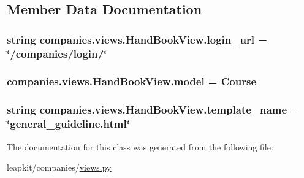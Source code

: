 \subsection{Member Data Documentation}
\hypertarget{classcompanies_1_1views_1_1_hand_book_view_ad0ef5ddf653ad4e570a8c2fed5541a48}{
\subsubsection[{login\-\_\-url}]{\setlength{\rightskip}{0pt plus 5cm}string companies.\-views.\-Hand\-Book\-View.\-login\-\_\-url = \char`\"{}/companies/login/\char`\"{}\hspace{0.3cm}{\ttfamily [static]}}}\label{classcompanies_1_1views_1_1_hand_book_view_ad0ef5ddf653ad4e570a8c2fed5541a48}
\hypertarget{classcompanies_1_1views_1_1_hand_book_view_af9c3733542a035e2832b9e987ee7e26c}{
\subsubsection[{model}]{\setlength{\rightskip}{0pt plus 5cm}companies.\-views.\-Hand\-Book\-View.\-model = {\bf Course}\hspace{0.3cm}{\ttfamily [static]}}}\label{classcompanies_1_1views_1_1_hand_book_view_af9c3733542a035e2832b9e987ee7e26c}
\hypertarget{classcompanies_1_1views_1_1_hand_book_view_a77e51bb1daf5d9fd62a4686a7d482924}{
\subsubsection[{template\-\_\-name}]{\setlength{\rightskip}{0pt plus 5cm}string companies.\-views.\-Hand\-Book\-View.\-template\-\_\-name = \char`\"{}general\-\_\-guideline.\-html\char`\"{}\hspace{0.3cm}{\ttfamily [static]}}}\label{classcompanies_1_1views_1_1_hand_book_view_a77e51bb1daf5d9fd62a4686a7d482924}


The documentation for this class was generated from the following file\-:\begin{DoxyCompactItemize}
\item 
leapkit/companies/\hyperlink{companies_2views_8py}{views.\-py}\end{DoxyCompactItemize}
